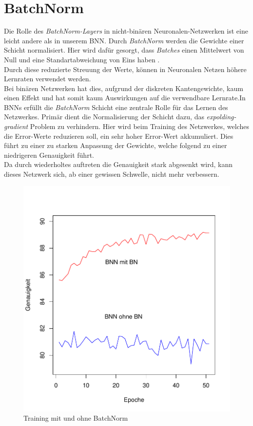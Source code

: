 \section{BatchNorm}
Die Rolle des \textit{BatchNorm-Layers} in nicht-binären Neuronalen-Netzwerken ist eine leicht andere als in unserem BNN. Durch \textit{BatchNorm} werden die Gewichte einer Schicht normalisiert. Hier wird dafür gesorgt, dass \textit{Batches} einen Mittelwert von Null und eine Standartabweichung von Eins haben\cite{batchnorm} .\\ 
Durch diese reduzierte Streuung der Werte, können in Neuronalen Netzen höhere Lernraten verwendet werden.\\
Bei binären Netzwerken hat dies, aufgrund der diskreten Kantengewichte, kaum einen Effekt und hat somit kaum Auswirkungen auf die verwendbare Lernrate.In BNNs erfüllt die \textit{BatchNorm} Schicht eine zentrale Rolle für das Lernen des Netzwerkes. Primär dient die Normalisierung der Schicht dazu, das \textit{expolding-gradient} Problem zu verhindern. Hier wird beim Training des Netzwerkes, welches die Error-Werte reduzieren soll, ein sehr hoher Error-Wert akkumuliert. Dies führt zu einer zu starken Anpassung der Gewichte, welche folgend zu einer niedrigeren Genauigkeit führt\cite{DBLP:journals/corr/abs-1909-09139}.\\
 Da durch wiederholtes auftreten die Genauigkeit stark abgesenkt wird, kann dieses Netzwerk sich, ab einer gewissen Schwelle, nicht mehr verbessern.
\begin{figure}[h]
	\centering
	\includegraphics[scale=0.7]{./bilder/_plot_batchnorm}
	\caption{Training mit und ohne BatchNorm}
	\label{fig:bn}
\end{figure}\\
